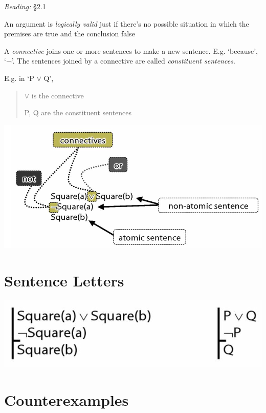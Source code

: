 \documentclass[12pt]{extarticle}
\begin{document}
\begin{multicols*}{3}
\emph{Reading:} §2.1
 
An argument is \emph{logically valid} just if there’s no possible situation in which the premises are true and the conclusion false
 
A \emph{connective} joins one or more sentences to make a new sentence. E.g. ‘because’, ‘¬’. The sentences joined by a connective are called \emph{constituent sentences}.
 
E.g. in ‘P $\lor{}$ Q’,
 
\begin{quote}
 
$\lor{}$ is the connective
 
P, Q are the constituent sentences
 
\end{quote}
 
\begin{center}
\includegraphics[scale=0.3]{img/terminology_more.png}
\end{center}
 
 
\section{Sentence Letters}
 
\begin{center}
\includegraphics[scale=0.3]{img/sentence_letters.png}
\end{center}
 
 
\section{Counterexamples}
 

\end{multicols*}
\end{document}
